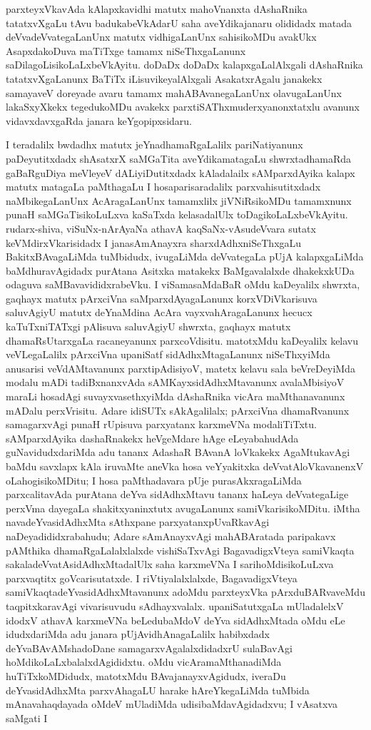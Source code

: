 parxteyxVkavAda kAlapxkavidhi matutx mahoVnanxta dAshaRnika tatatxvX\-gaLu tAvu badukabeVkAdarU saha aveYdikajanaru olididadx matada deVvadeVvate\-gaLanUnx matutx vidhigaLanUnx sahisikoMDu avakUkx AsapxdakoDuva maTiTxge tamamx niSeThxgaLanunx saDila\-goLisikoLaLxbeVkAyitu. doDaDx doDaDx kalapxgaLalAlxgali dAshaRnika tatatxvXgaLanunx BaTiTx iLisuvikeyalAlxgali AsakatxrAgalu janakekx samayaveV doreyade avaru tamamx mahA\-BAvanegaLanUnx olavugaLanUnx lakaSxyXkekx tegedukoMDu avakekx parxtiSAThx\-muderx\-yanonxtatxlu avanunx vidavxdavxgaRda janara keYgopipxsidaru.

I teradalilx bwdadhx matutx jeYnadhamaRgaLalilx pariNatiyanunx paDeyutitxdadx shAsatxrX saMGa\-Tita aveYdikamatagaLu shwrxtadhamaRda gaBaRguDiya meVleyeV dALiyiDutitxdadx kAla\-dalailx sAMparxdAyika kalapx matutx matagaLa paMthagaLu I hosaparisaradalilx parxvahisu\-titxdadx naMbikegaLanUnx AcAragaLanUnx tamamxlilx jiVNiRsikoMDu tamamxnunx punaH saMGaTisi\-koLuLxva kaSaTxda kelasadalUlx toDagikoLaLxbeVkAyitu. rudarx-shiva, viSuNx-nArAyaNa athavA kaqSaNx-vAsudeVvara sutatx keVMdirxVkarisidadx I janasAmAnayxra sharxdAdhxniSeThxgaLu Bakitx\-BAvagaLiMda tuMbidudx, ivugaLiMda deVvategaLa pUjA kalapxgaLiMda baMdhuravAgidadx purAtana Asitxka matakekx BaMgavalalxde dhakekxkUDa odaguva saMBavavididxrabeVku. I viSama\-saMdaBaR oMdu kaDeyalilx shwrxta, gaqhayx matutx pArxciVna saMparxdAyagaLanunx korxVDiV\-karisuva saluvAgiyU matutx deYnaMdina AcAra vayxvahAragaLanunx hecucx kaTuTxniTATxgi pAlisuva saluvAgiyU shwrxta, gaqhayx matutx dhamaRsUtarxgaLa racaneyanunx parxcoVdi\-situ. matotxMdu kaDeyalilx kelavu veVLegaLalilx pArxciVna upaniSatf sidAdhxMtagaLanunx niSeThxyiMda anusarisi veVdAMtavanunx parxtipAdisiyoV, matetx kelavu sala beVreDe\-yiMda modalu mADi tadiBxnanxvAda sAMKayxsidAdhxMtavanunx avalaMbisiyoV maraLi hosadAgi suvayxvasethxyiMda dAshaRnika vicAra maMthanavanunx mADalu perxVrisitu. Adare idiSUTx sAkAgalilalx; pArxciVna dhamaRvanunx samagarxvAgi punaH rUpisuva parxyatanx karxmeVNa modaliTiTxtu. sAMparxdAyika dashaRnakekx heVgeMdare hAge eLeyabahudAda guNavidudxdariMda adu tananx AdashaR BAvanA loVkakekx AgaMtukavAgi baMdu savxlapx kAla iruvaMte aneVka hosa veYyakitxka deVvatAloVkavanenxV oLahogisikoMDitu; I hosa paMthadavara pUje purasAkxragaLiMda parxcalitavAda purAtana deYva sidAdhxMtavu tananx haLeya deVvategaLige perxVma dayegaLa shakitxyaninxtutx avugaLanunx samiVkarisikoMDitu. iMtha navadeYvasidAdhxMta sAthxpane parxyatanxpUvaRkavAgi naDeyadididxrabahudu; Adare sAmAnayxvAgi mahABAratada paripakavx pAMthika dhamaRgaLalalxlalxde vishiSaTxvAgi BagavadigxVteya samiVkaqta sakaladeVvatAsidAdhxMtadalUlx saha karxmeVNa I sarihoMdisikoLuLxva parxvaqtitx goVcarisutatxde. I riVtiyalalxlalxde, BagavadigxVteya samiVkaqtadeYvasidAdhxMtavanunx adoMdu parxteyxVka pArxduBARvaveMdu taqpitxkaravAgi vivarisuvudu sAdhayxvalalx. upaniSatutxgaLa mUladalelxV idodxV athavA karxmeVNa beLedubaMdoV deYva sidAdhxMtada oMdu eLe idudxdariMda adu janara pUjAvidhAnagaLalilx habibxdadx deYvaBAvAMshadoDane samagarxvAgalalxdidadxrU sulaBavAgi hoMdikoLaLxbalalxdAgididxtu. oMdu vicAramaMthanadiMda huTiTxkoMDidudx, matotxMdu BAvajanayxvAgidudx, iveraDu deYvasidAdhxMta parxvAhagaLU harake hAreYkegaLiMda tuMbida mAnavahaqdayada oMdeV mUladiMda udisibaMdavAgidadxvu; I vAsatxva saMgati I 